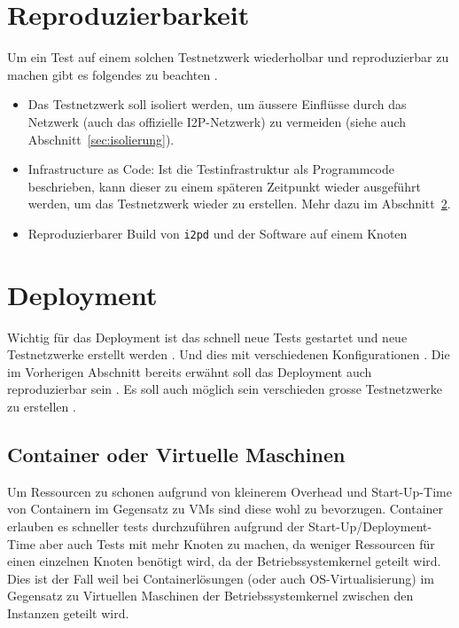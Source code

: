 \section{Reproduzierbarkeit}

Um ein Test auf einem solchen Testnetzwerk wiederholbar und reproduzierbar zu machen gibt es folgendes zu beachten .

\begin{itemize}
    \item Das Testnetzwerk soll isoliert werden, um äussere Einflüsse durch das Netzwerk (auch das offizielle I2P-Netzwerk) zu vermeiden (siehe auch Abschnitt~\ref{sec:isolierung}).
    \item Infrastructure as Code: Ist die Testinfrastruktur als Programmcode beschrieben, kann dieser zu einem späteren Zeitpunkt wieder ausgeführt werden, um das Testnetzwerk wieder zu erstellen. Mehr dazu im Abschnitt~\ref{sec:deployment}.
    \item Reproduzierbarer Build von \lstinline|i2pd| und der Software auf einem Knoten
\end{itemize}


\section{Deployment}\label{sec:deployment}

Wichtig für das Deployment ist das schnell neue Tests gestartet und neue Testnetzwerke erstellt werden .
Und dies mit verschiedenen Konfigurationen .
Die im Vorherigen Abschnitt bereits erwähnt soll das Deployment auch reproduzierbar sein .
Es soll auch möglich sein verschieden grosse Testnetzwerke zu erstellen .


\subsection{Container oder Virtuelle Maschinen}

Um Ressourcen zu schonen aufgrund von kleinerem Overhead und Start-Up-Time von Containern im Gegensatz zu VMs sind diese wohl zu bevorzugen.
Container erlauben es schneller tests durchzuführen  aufgrund der Start-Up/Deployment-Time
aber auch Tests mit mehr Knoten zu machen, da weniger Ressourcen für einen einzelnen Knoten benötigt wird, da der Betriebssystemkernel geteilt wird.
Dies ist der Fall weil bei Containerlösungen (oder auch OS-Virtualisierung) im Gegensatz zu Virtuellen Maschinen der Betriebssystemkernel zwischen den Instanzen geteilt wird.

